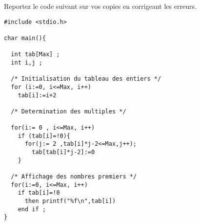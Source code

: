   Reportez le code suivant sur vos copies en corrigeant les erreurs.
\begin{verbatim}
#include <stdio.h>

char main(){

  int tab[Max] ;
  int i,j ;

  /* Initialisation du tableau des entiers */
  for (i:=0, i<=Max, i++) 
    tab[i]:=i+2 
  
  /* Determination des multiples */

  for(i:= 0 , i<=Max, i++)
    if (tab[i]=!0){
      for(j:= 2 ,tab[i]*j-2<=Max,j++);
        tab[tab[i]*j-2]:=0 
    }

  /* Affichage des nombres premiers */
  for(i:=0, i<=Max, i++) 
    if tab[i]=!0
      then printf("%f\n",tab[i]) 
    end if ;
}
\end{verbatim}
